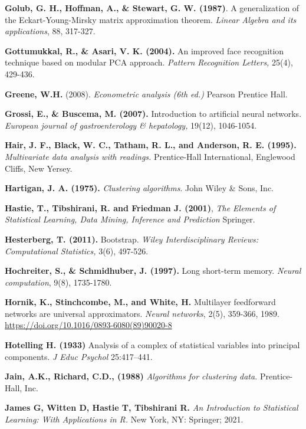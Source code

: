\begin{thebibliography}{99}
\textbf{Golub, G. H., Hoffman, A., \& Stewart, G. W. (1987)}. A generalization of the Eckart-Young-Mirsky matrix approximation theorem. \emph{Linear Algebra and its applications}, 88, 317-327.

 \textbf{Gottumukkal, R., \& Asari, V. K. (2004).} An improved face recognition technique based on modular PCA approach.\emph{ Pattern Recognition Letters,} 25(4), 429-436.

\textbf{Greene,  W.H.} (2008). \emph{Econometric analysis (6th ed.)} Pearson Prentice Hall.

\textbf{Grossi, E., \& Buscema, M. (2007). }Introduction to artificial neural networks. \emph{European journal of gastroenterology \& hepatology,} 19(12), 1046-1054.

\textbf{Hair, J. F., Black, W. C., Tatham, R. L., and Anderson, R. E. (1995).}
\textit{ Multivariate data analysis with readings.} Prentice-Hall International, Englewood Cliffs, New Yersey. 

\textbf{Hartigan, J. A. (1975).}\emph{ Clustering algorithms}. John Wiley \& Sons, Inc.

 \textbf{Hastie, T., Tibshirani, R. and Friedman J. (2001)}, \textit{The Elements of Statistical Learning, Data Mining, Inference and Prediction} Springer. 

\textbf{Hesterberg, T. (2011).} Bootstrap. \emph{Wiley Interdisciplinary Reviews: Computational Statistics,} 3(6), 497-526.

\textbf{Hochreiter, S., \& Schmidhuber, J. (1997).} Long short-term memory.\emph{ Neural computation}, 9(8), 1735-1780.

 \textbf{Hornik, K., Stinchcombe, M., and White, H. } Multilayer feedforward networks are universal approximators. \emph{Neural networks}, 2(5), 359-366, 1989.
\url{https://doi.org/10.1016/0893-6080(89)90020-8}

\textbf{Hotelling H. (1933)} Analysis of a complex of statistical variables
into principal components. \emph{J Educ Psychol }
25:417–441.

 \textbf{Jain, A.K., Richard, C.D., (1988)} \textit{Algorithms for clustering data.} Prentice-Hall, Inc.

\textbf{James G, Witten D, Hastie T, Tibshirani R.} \emph{An Introduction to Statistical Learning: With Applications in R.} New York, NY: Springer; 2021. 


\end{thebibliography}
